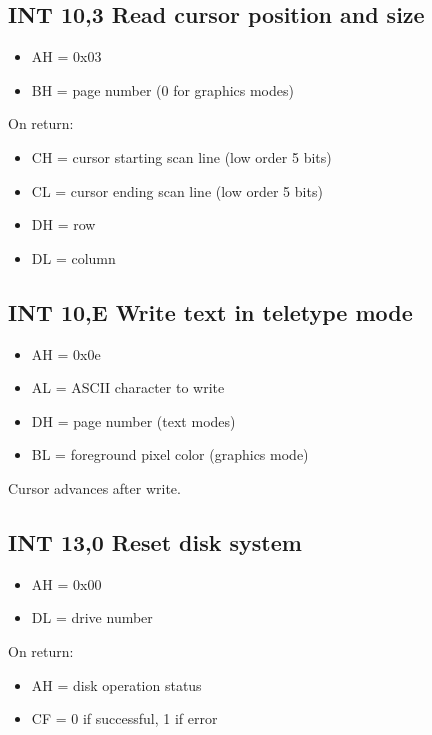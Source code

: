 \subsection{INT 10,3 Read cursor position and size}
\begin{itemize}
  \item
    AH = 0x03
  \item
    BH = page number (0 for graphics modes)
\end{itemize}

On return:

\begin{itemize}
  \item
    CH = cursor starting scan line (low order 5 bits)
  \item
    CL = cursor ending scan line (low order 5 bits)
  \item
    DH = row
  \item
    DL = column
\end{itemize}


\subsection{INT 10,E Write text in teletype mode}
\begin{itemize}
  \item
    AH = 0x0e
  \item
    AL = ASCII character to write
  \item
    DH = page number (text modes)
  \item
    BL = foreground pixel color (graphics mode)
\end{itemize}

Cursor advances after write.

%
%
\subsection{INT 13,0 Reset disk system}
\begin{itemize}
  \item
    AH = 0x00
  \item
    DL = drive number
\end{itemize}

On return:

\begin{itemize}
  \item
    AH = disk operation status
  \item
    CF = 0 if successful, 1 if error
\end{itemize}

